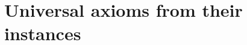 \providecommand{\univR}[1]{\textup{(R$_{#1}$)}}
\providecommand{\univD}[1]{\textup{(D$_{#1}$)}}
\providecommand{\univRich}{\textup{(Rich$_{\mathrm{c}}$)}}
\providecommand{\univcl}{\mathrm{cl}}
\providecommand{\univroot}{\mathrm{root}}

\section{Universal axioms from their instances}\label{sec:univ}

